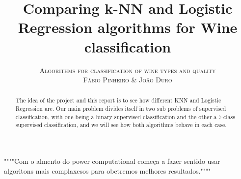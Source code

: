 \documentclass[twoside]{article}
\title{\vspace{-15mm}\fontsize{24pt}{10pt}\selectfont\textbf{Comparing k-NN and Logistic Regression algorithms for Wine classification}}
\author{
\large
\textsc{Algorithms for classification of wine types and quality}\\[2mm]
\textsc{F\'{a}bio Pinheiro  \& Jo\~{a}o Duro}\\[2mm]
\vspace{-5mm}
}
\date{}
\begin{document}
\maketitle %


\begin{abstract}
The idea of the project and this report is to see how different KNN and Logistic Regression are. Our main problem divides itself in two sub problems of supervised classification, with one being a binary supervised classification and the other a 7-class supervised classification, and we will see how both algorithms behave in each case.


\end{abstract}
""""Com o almento do power computational começa a fazer sentido usar algoritons mais complaxesos para obetremos melhores resultados.""""

\end{document}

